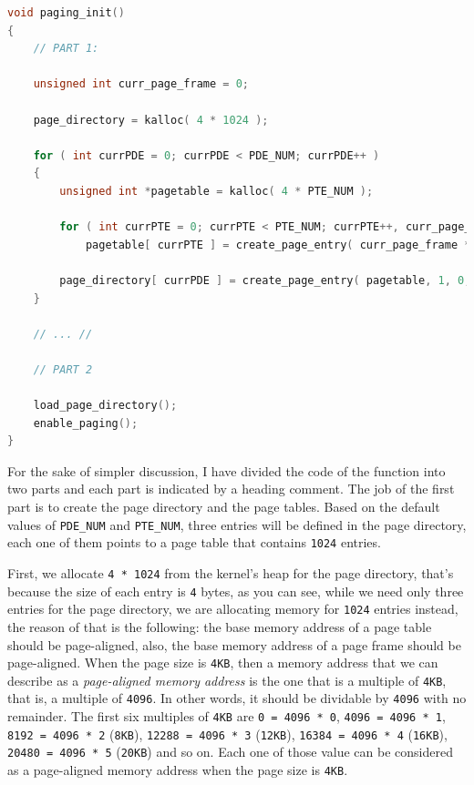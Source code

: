 \begin{lstlisting}[language=C]
void paging_init()
{
    // PART 1:
    
    unsigned int curr_page_frame = 0;
    
    page_directory = kalloc( 4 * 1024 );
        
    for ( int currPDE = 0; currPDE < PDE_NUM; currPDE++ )
    {
        unsigned int *pagetable = kalloc( 4 * PTE_NUM );
        
        for ( int currPTE = 0; currPTE < PTE_NUM; currPTE++, curr_page_frame++ )
            pagetable[ currPTE ] = create_page_entry( curr_page_frame * 4096, 1, 0, 0, 1, 1, 0, 0, 0 );
        
        page_directory[ currPDE ] = create_page_entry( pagetable, 1, 0, 0, 1, 1, 0, 0, 0 );
    }
    
    // ... //
    
    // PART 2
    
    load_page_directory();
    enable_paging();
}
\end{lstlisting}

For the sake of simpler discussion, I have divided the code of the
function into two parts and each part is indicated by a heading comment.
The job of the first part is to create the page directory and the page
tables. Based on the default values of \lstinline!PDE_NUM! and
\lstinline!PTE_NUM!, three entries will be defined in the page
directory, each one of them points to a page table that contains
\lstinline!1024! entries.

First, we allocate \lstinline!4 * 1024! from the kernel's heap for the
page directory, that's because the size of each entry is \lstinline!4!
bytes, as you can see, while we need only three entries for the page
directory, we are allocating memory for \lstinline!1024! entries
instead, the reason of that is the following: the base memory address of
a page table should be page-aligned, also, the base memory address of a
page frame should be page-aligned. When the page size is
\lstinline!4KB!, then a memory address that we can describe as a
\emph{page-aligned memory address} is the one that is a multiple of
\lstinline!4KB!, that is, a multiple of \lstinline!4096!. In other
words, it should be dividable by \lstinline!4096! with no remainder. The
first six multiples of \lstinline!4KB! are \lstinline!0 = 4096 * 0!,
\lstinline!4096 = 4096 * 1!, \lstinline!8192 = 4096 * 2!
(\lstinline!8KB!), \lstinline!12288 = 4096 * 3! (\lstinline!12KB!),
\lstinline!16384 = 4096 * 4! (\lstinline!16KB!),
\lstinline!20480 = 4096 * 5! (\lstinline!20KB!) and so on. Each one of
those value can be considered as a page-aligned memory address when the
page size is \lstinline!4KB!.

